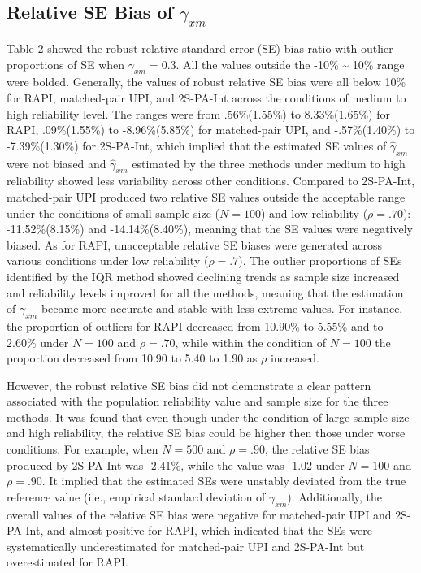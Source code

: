 \documentclass[
  man]{apa7}
\newenvironment{lltable}{\begin{landscape}\centering\begin{ThreePartTable}}{\end{ThreePartTable}\end{landscape}}
\begin{document}
\begin{lltable}
{}

\end{lltable}

\hypertarget{relative-se-bias-of-gamma_xm}{%
\subsection{\texorpdfstring{Relative SE Bias of \(\gamma_{xm}\)}{Relative SE Bias of \textbackslash gamma\_\{xm\}}}\label{relative-se-bias-of-gamma_xm}}

Table 2 showed the robust relative standard error (SE) bias ratio with outlier proportions of SE when \(\gamma_{xm} = 0.3\). All the values outside the -10\% \textasciitilde{} 10\% range were bolded. Generally, the values of robust relative SE bias were all below 10\% for RAPI, matched-pair UPI, and 2S-PA-Int across the conditions of medium to high reliability level. The ranges were from .56\%(1.55\%) to 8.33\%(1.65\%) for RAPI, .09\%(1.55\%) to -8.96\%(5.85\%) for matched-pair UPI, and -.57\%(1.40\%) to -7.39\%(1.30\%) for 2S-PA-Int, which implied that the estimated SE values of \(\hat{\gamma}_{xm}\) were not biased and \(\hat{\gamma}_{xm}\) estimated by the three methods under medium to high reliability showed less variability across other conditions. Compared to 2S-PA-Int, matched-pair UPI produced two relative SE values outside the acceptable range under the conditions of small sample size (\(\textit{N} = 100\)) and low reliability (\(\rho = .70\)): -11.52\%(8.15\%) and -14.14\%(8.40\%), meaning that the SE values were negatively biased. As for RAPI, unacceptable relative SE biases were generated across various conditions under low reliability (\(\rho = .7\)). The outlier proportions of SEs identified by the IQR method showed declining trends as sample size increased and reliability levels improved for all the methods, meaning that the estimation of \(\gamma_{xm}\) became more accurate and stable with less extreme values. For instance, the proportion of outliers for RAPI decreased from 10.90\% to 5.55\% and to 2.60\% under \(\textit{N} = 100\) and \(\rho = .70\), while within the condition of \(\textit{N} = 100\) the proportion decreased from 10.90 to 5.40 to 1.90 as \(\rho\) increased.

However, the robust relative SE bias did not demonstrate a clear pattern associated with the population reliability value and sample size for the three methods. It was found that even though under the condition of large sample size and high reliability, the relative SE bias could be higher then those under worse conditions. For example, when \(\textit{N} = 500\) and \(\rho = .90\), the relative SE bias produced by 2S-PA-Int was -2.41\%, while the value was -1.02 under \(\textit{N} = 100\) and \(\rho = .90\). It implied that the estimated SEs were unstably deviated from the true reference value (i.e., empirical standard deviation of \(\gamma_{xm}\)). Additionally, the overall values of the relative SE bias were negative for matched-pair UPI and 2S-PA-Int, and almost positive for RAPI, which indicated that the SEs were systematically underestimated for matched-pair UPI and 2S-PA-Int but overestimated for RAPI.
\end{document}

